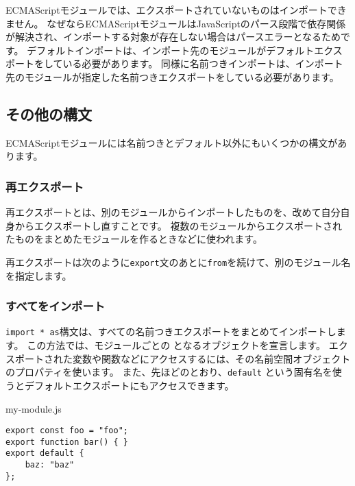 ECMAScriptモジュールでは、エクスポートされていないものはインポートできません。
なぜならECMAScriptモジュールはJavaScriptのパース段階で依存関係が解決され、インポートする対象が存在しない場合はパースエラーとなるためです。
デフォルトインポートは、インポート先のモジュールがデフォルトエクスポートをしている必要があります。
同様に名前つきインポートは、インポート先のモジュールが指定した名前つきエクスポートをしている必要があります。

\hypertarget{other-syntax}{%
\subsection{その他の構文}\label{other-syntax}}

ECMAScriptモジュールには名前つきとデフォルト以外にもいくつかの構文があります。

\hypertarget{re-export}{%
\subsubsection{再エクスポート}\label{re-export}}

再エクスポートとは、別のモジュールからインポートしたものを、改めて自分自身からエクスポートし直すことです。
複数のモジュールからエクスポートされたものをまとめたモジュールを作るときなどに使われます。

再エクスポートは次のように\texttt{export}文のあとに\texttt{from}を続けて、別のモジュール名を指定します。



\hypertarget{namespace-import}{%
\subsubsection{すべてをインポート}\label{namespace-import}}

\texttt{import * as}構文は、すべての名前つきエクスポートをまとめてインポートします。
この方法では、モジュールごとの \textbf{}
となるオブジェクトを宣言します。
エクスポートされた変数や関数などにアクセスするには、その名前空間オブジェクトのプロパティを使います。
また、先ほどのとおり、\texttt{default}
という固有名を使うとデフォルトエクスポートにもアクセスできます。

\begin{listtitle}
my-module.js
\end{listtitle}
\begin{lstlisting}
export const foo = "foo";
export function bar() { }
export default {
    baz: "baz"
};
\end{lstlisting}
\listend

